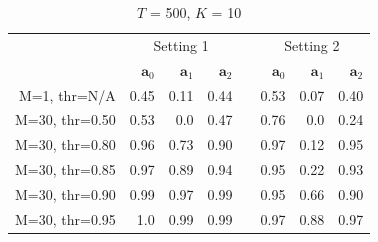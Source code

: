 \documentclass[conference]{IEEEtran}
\newcommand{\p}[1]{{\color{blue} Pdj: #1}}
\begin{document}



\begin{table}[h!]
  \begin{center}
    \renewcommand{\arraystretch}{1.2}
    \begin{tabular}{@{}r rrr c rrr@{}}
      \toprule
      & \multicolumn{3}{c}{Setting 1} & & \multicolumn{3}{c}{Setting 2} \\
      \cmidrule{2-4} \cmidrule{6-8}
                       & $\mathbf{a}_0$ & $\mathbf{a}_1$  & $\mathbf{a}_2$  && $\mathbf{a}_0$  & $\mathbf{a}_1$  & $\mathbf{a}_2$  \\
      \midrule
      {M=1, \hfill thr=N/A}
                       & 0.45  & 0.11  & 0.44  && 0.53  & 0.07  & 0.40  \\
      {M=30, thr=0.50} & 0.53  & 0.0   & 0.47  && 0.76  & 0.0   & 0.24  \\
      {M=30, thr=0.80} & 0.96  & 0.73  & 0.90  && 0.97  & 0.12  & 0.95  \\
      {M=30, thr=0.85} & 0.97  & 0.89  & 0.94  && 0.95  & 0.22  & 0.93  \\
      {M=30, thr=0.90} & 0.99  & 0.97  & 0.99  && 0.95  & 0.66  & 0.90  \\
      {M=30, thr=0.95} & 1.0   & 0.99  & 0.99  && 0.97  & 0.88  & 0.97  \\
      \bottomrule
    \end{tabular}
    \caption{$T$ = 500, $K$ = 10}
    \label{tab:1}
  \end{center}
\end{table}
\end{document}
